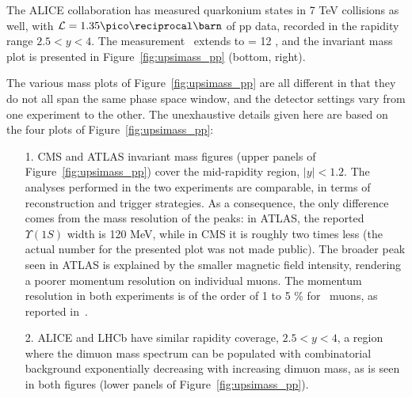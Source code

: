


The ALICE collaboration has measured quarkonium states in 7 TeV
collisions as well, with $\lumi = 1.35 \invpb$ of pp data, recorded in the
rapidity range $2.5 < y < 4$. The measurement~\cite{aliceUpsi_pp} extends to \pt = 12
\GeVc, and the invariant mass plot is presented in
Figure~\ref{fig:upsimass_pp} (bottom, right).



The various mass plots of Figure~\ref{fig:upsimass_pp} are all
different in that they do not all span the same phase space window,
and the detector settings vary from one experiment to the other. The
unexhaustive details given here are based on the four plots of
Figure~\ref{fig:upsimass_pp}:
\begin{itemize}
\item[1.]{CMS and ATLAS invariant mass figures (upper panels of
    Figure~\ref{fig:upsimass_pp}) cover the mid-rapidity region,
    $\vert y \vert < 1.2$. The analyses performed in the two experiments are
    comparable, in terms of reconstruction and trigger strategies. As
    a consequence, the only difference comes from the mass resolution
    of the peaks: in ATLAS, the reported $\Upsilon(1S)$ width is 120
    MeV, while in CMS it is roughly two times less (the actual number
    for the presented plot was not made public). The broader peak seen
    in ATLAS is explained by the smaller magnetic field intensity,
    rendering a poorer momentum resolution on individual muons. The
    momentum resolution in both experiments is of the order of 1 to 5
    \% for \Jpsi\ muons, as reported in~\cite{Aad:2014rra,CMS:2010oua}.}
\item[2.]{ALICE and LHCb have similar rapidity coverage, $2.5 < y <
    4$, a region where the dimuon mass spectrum can
    be populated with combinatorial background exponentially
    decreasing with increasing dimuon mass, as is seen in both figures
    (lower panels of
    Figure~\ref{fig:upsimass_pp}).}
\end{itemize}


